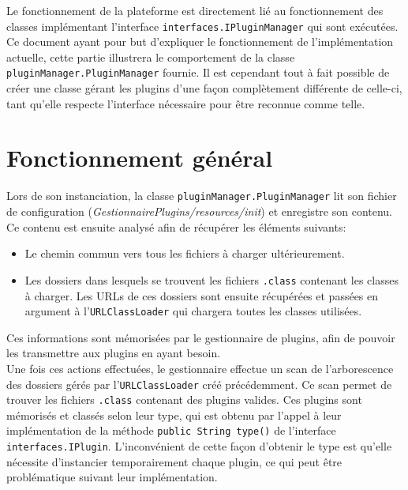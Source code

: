
Le fonctionnement de la plateforme est directement lié au fonctionnement des classes implémentant l'interface \texttt{interfaces.IPluginManager} qui sont exécutées. Ce document ayant pour but d'expliquer le fonctionnement de l'implémentation actuelle, cette partie illustrera le comportement de la classe \texttt{pluginManager.PluginManager} fournie. Il est cependant tout à fait possible de créer une classe gérant les plugins d'une façon complètement différente de celle-ci, tant qu'elle respecte l'interface nécessaire pour être reconnue comme telle.

\section{Fonctionnement général}

Lors de son instanciation, la classe \texttt{pluginManager.PluginManager} lit son fichier de configuration (\textit{GestionnairePlugins/resources/init}) et enregistre son contenu. Ce contenu est ensuite analysé afin de récupérer les éléments suivants:\\

\begin{itemize}
	\item Le chemin commun vers tous les fichiers à charger ultérieurement.
	\item Les dossiers dans lesquels se trouvent les fichiers \texttt{.class} contenant les classes à charger. Les URLs de ces dossiers sont ensuite récupérées et passées en argument à l'\texttt{URLClassLoader} qui chargera toutes les classes utilisées.\\
\end{itemize}

Ces informations sont mémorisées par le gestionnaire de plugins, afin de pouvoir les transmettre aux plugins en ayant besoin.\\

Une fois ces actions effectuées, le gestionnaire effectue un scan de l'arborescence des dossiers gérés par l'\texttt{URLClassLoader} créé précédemment. Ce scan permet de trouver les fichiers \texttt{.class} contenant des plugins valides. Ces plugins sont mémorisés et classés selon leur type, qui est obtenu par l'appel à leur implémentation de la méthode \texttt{public String type()} de l'interface \texttt{interfaces.IPlugin}. L'inconvénient de cette façon d'obtenir le type est qu'elle nécessite d'instancier temporairement chaque plugin, ce qui peut être problématique suivant leur implémentation.\\

